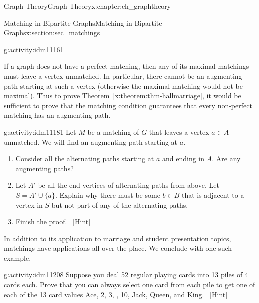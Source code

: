 \documentclass[oneside,10pt,]{book}
\numberwithin{equation}{chapter}
\newcommand{\vtx}[2]{node[fill,circle,inner sep=0pt, minimum size=4pt,label=#1:#2]{}}
\renewcommand{\v}{\vtx{above}{}}
\begin{document}
\begin{chapterptx}{Graph Theory}{}{Graph Theory}{}{}{x:chapter:ch_graphtheory}
\begin{sectionptx}{Matching in Bipartite Graphs}{}{Matching in Bipartite Graphs}{}{}{x:section:sec_matchings}
\begin{activity}{}{g:activity:idm11161}
\begin{enumerate}[font=\bfseries,label=(\alph*),ref=\alph*]
\begin{sidebyside}{1}{0.25}{0.25}{0}
\begin{sbspanel}{0.5}
{
}%
\end{sbspanel}%
\end{sidebyside}%
\end{enumerate}
\end{activity}
If a graph does not have a perfect matching, then any of its maximal matchings must leave a vertex unmatched.  In particular, there cannot be an augmenting path starting at such a vertex (otherwise the maximal matching would not be maximal).  Thus to prove \hyperref[x:theorem:thm-hallmarriage]{Theorem~\ref{x:theorem:thm-hallmarriage}}, it would be sufficient to prove that the matching condition guarantees that every non-perfect matching has an augmenting path.%
\begin{activity}{}{g:activity:idm11181}%
Let \(M\) be a matching of \(G\) that leaves a vertex \(a \in A\) unmatched.  We will find an augmenting path starting at \(a\).%
\begin{enumerate}[font=\bfseries,label=(\alph*),ref=\alph*]
\item{}Consider all the alternating paths starting at \(a\) and ending in \(A\).  Are any augmenting paths?%
\item{}Let \(A'\) be all the end vertices of alternating paths from above.  Let \(S = A' \cup \{a\}\).  Explain why there must be some \(b \in B\) that is adjacent to a vertex in \(S\) but not part of any of the alternating paths.%
\item{}Finish the proof.%
\qquad~\hfill{\tiny\hyperlink{g:hint:idm11203-back}{[Hint]}}\end{enumerate}
\end{activity}
In addition to its application to marriage and student presentation topics, matchings have applications all over the place. We conclude with one such example.%
\begin{activity}{}{g:activity:idm11208}%
Suppose you deal 52 regular playing cards into 13 piles of 4 cards each. Prove that you can always select one card from each pile to get one of each of the 13 card values Ace, 2, 3, \textellipsis{}, 10, Jack, Queen, and King.%
\qquad~\hfill{\tiny\hyperlink{g:hint:idm11212-back}{[Hint]}}\end{activity}

\end{sectionptx}
\end{chapterptx}
\end{document}
